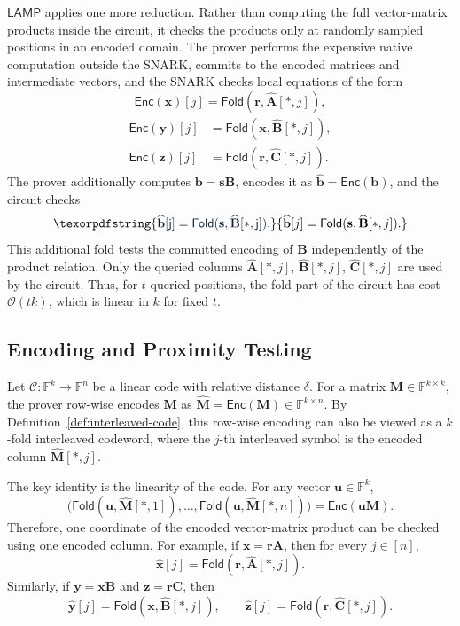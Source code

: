 \documentclass[conference,compsoc]{IEEEtran}
\newcommand{\mat}{\mathbf}          %
\newcommand{\vect}{\mathbf}         %
\renewcommand{\enc}{\mathsf{Enc}}   %
\newcommand{\fold}{\textsf{Fold}}
\newcommand{\protocol}{\textsf{LAMP}}   %
\theoremstyle{plain}
\theoremstyle{definition}
\theoremstyle{remark}
\providecommand{\DIFaddtex}[1]{{\protect\color{DIFADD} \sf #1}} %
\providecommand{\DIFaddbegin}{} %
\providecommand{\DIFaddend}{} %
\providecommand{\DIFadd}[1]{\texorpdfstring{\DIFaddtex{#1}}{#1}} %
\providecommand{\DIFaddincludegraphics}[2][]{{\color{blue}\fbox{\DIFOincludegraphics[#1]{#2}}}} %
\DeclareRobustCommand{\DIFaddbegin}{\DIFOaddbegin \let\includegraphics\DIFaddincludegraphics} %
\DeclareRobustCommand{\DIFaddend}{\DIFOaddend \let\includegraphics\DIFOincludegraphics} %
\begin{document}
\(\protocol\) applies one more reduction.  Rather than computing the full
vector-matrix products inside the circuit, it checks the products only at
randomly sampled positions in an encoded domain.  The prover performs the
expensive native computation outside the SNARK, commits to the encoded
matrices and intermediate vectors, and the SNARK checks local equations of the
form
\[
  \enc(\vect{x})[j]
  =
  \fold(\vect{r},\widehat{\mat{A}}[*,j]),
\]
\[
\begin{aligned}
  \enc(\vect{y})[j]
  &=
  \fold(\vect{x},\widehat{\mat{B}}[*,j]),\\
  \enc(\vect{z})[j]
  &=
  \fold(\vect{r},\widehat{\mat{C}}[*,j]).
\end{aligned}
\]
\DIFaddbegin \DIFadd{The prover additionally computes \(\vect{b}=\vect{s}\mat{B}\), encodes it as
\(\widehat{\vect{b}}=\enc(\vect{b})\), and the circuit checks
}\[
  \DIFadd{\widehat{\vect{b}}[j]
  =
  \fold(\vect{s},\widehat{\mat{B}}[*,j]).
}\]
\DIFadd{This additional fold tests the committed encoding of \(\mat{B}\) independently
of the product relation.
}\DIFaddend Only the queried columns
\(\widehat{\mat{A}}[*,j]\), \(\widehat{\mat{B}}[*,j]\),
\(\widehat{\mat{C}}[*,j]\) are used by the circuit.  Thus, for \(t\) queried
positions, the fold part of the circuit has cost \(\mathcal{O}(tk)\), which is
linear in \(k\) for fixed \(t\).

\subsection{Encoding and Proximity Testing}
\label{sec:overview-encoding}

Let \(\mathcal{C}:\mathbb{F}^k\to\mathbb{F}^n\) be a linear code
with relative distance \(\delta\).  For a matrix
\(\mat{M}\in\mathbb{F}^{k\times k}\), the prover row-wise encodes \(\mat{M}\)
as $\widehat{\mat{M}}=\enc(\mat{M})\in\mathbb{F}^{k\times n}$.
By Definition~\ref{def:interleaved-code}, this row-wise encoding can also be
viewed as a \(k\)-fold interleaved codeword, where the \(j\)-th interleaved
symbol is the encoded column \(\widehat{\mat{M}}[*,j]\).

The key identity is the linearity of the code.  For any vector
\(\vect{u}\in\mathbb{F}^k\),
\[
  \big(
  \fold(\vect{u},\widehat{\mat{M}}[*,1]),
  \ldots,
  \fold(\vect{u},\widehat{\mat{M}}[*,n])
  \big)
  =
  \enc(\vect{u}\mat{M}).
\]
Therefore, one coordinate of the encoded vector-matrix product can be checked
using one encoded column.  For example, if
\(\vect{x}=\vect{r}\mat{A}\), then for every \(j\in[n]\),
\[
  \widehat{\vect{x}}[j]
  =
  \fold(\vect{r},\widehat{\mat{A}}[*,j]).
\]
Similarly, if \(\vect{y}=\vect{x}\mat{B}\) and
\(\vect{z}=\vect{r}\mat{C}\), then
\[
  \widehat{\vect{y}}[j]
  =
  \fold(\vect{x},\widehat{\mat{B}}[*,j]),
  \qquad
  \widehat{\vect{z}}[j]
  =
  \fold(\vect{r},\widehat{\mat{C}}[*,j]).
\]
\end{document}
